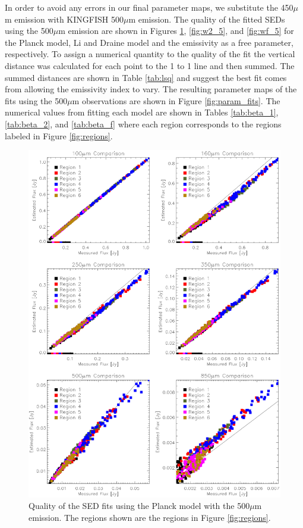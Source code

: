 In order to avoid any errors in our final parameter maps, we substitute the 450$\mu$m emission with KINGFISH 500$\mu$m emission.  The quality of the fitted SEDs using the 500$\mu$m emission are shown in Figures \ref{fig:w1_5}, \ref{fig:w2_5}, and \ref{fig:wf_5} for the Planck model, Li and Draine model and the emissivity as a free parameter, respectively.  To assign a numerical quantity to the quality of the fit the vertical distance was calculated for each point to the 1 to 1 line and then summed.  The summed distances are shown in Table \ref{tab:lsq} and suggest the best fit comes from allowing the emissivity index to vary.  The resulting parameter maps of the fits using the 500$\mu$m observations are shown in Figure \ref{fig:param_fits}. The numerical values from fitting each model are shown in Tables \ref{tab:beta_1}, \ref{tab:beta_2}, and \ref{tab:beta_f} where each region corresponds to the regions labeled in Figure \ref{fig:regions}.

\begin{figure}
  \centering
  \includegraphics[width=1.\textwidth]{sed_imgs/flux_compare_1_5.eps}
  \caption[Planck Model SED Fit Quality Using 500$\mu$m Data]{Quality of the SED fits using the Planck model with the 500$\mu$m emission.  The regions shown are the regions in Figure \ref{fig:regions}.}
  \label{fig:w1_5}
\end{figure}


